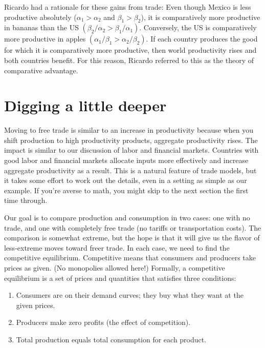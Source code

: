 Ricardo had a rationale for these gains from trade:  Even though
Mexico is less productive absolutely ($\alpha_{1}>\alpha_{2}$ and
$\beta_{1}>\beta_{2}$), it is comparatively more productive in
bananas than the US
$(\beta_{2}/\alpha_{2} > \beta_{1}/\alpha_{1})$.
Conversely, the US is comparatively more productive in apples
$ ( \alpha_{1}/\beta_{1} > \alpha_{2} /\beta_{2} )$.
If each country produces the good for which it is comparatively
more productive, then world productivity rises and both countries
benefit.
For this reason, Ricardo referred to this as the theory of comparative
advantage.


\section{Digging a little deeper}

Moving to free trade is similar to an
increase in productivity because when you shift production to high
productivity products, aggregate productivity rises.  The impact
is similar to our discussion of labor and financial markets.
Countries with good labor and financial markets allocate inputs
more effectively and increase aggregate productivity as a
result.  This is a natural feature of trade models, but it takes
some effort to work out the details, even in a setting as simple
as our example.  If you're averse to math, you might
skip to the next section the first time through.

Our goal is to compare production and consumption in two cases:
one with no trade, and one with completely free trade (no tariffs
or transportation costs).  The comparison is somewhat extreme, but
the hope is that it will give us the flavor of less-extreme moves
toward freer trade.  In each case, we need to find the competitive
equilibrium.  Competitive means that consumers and producers
take prices as given.  (No monopolies allowed here!)
Formally, a competitive equilibrium is a set of prices and
quantities that satisfies three conditions:
%
\begin{enumerate}
\item Consumers are on their demand curves;  they buy what they
want at the given prices.

\item Producers make zero profits (the effect of competition).

\item Total production equals total consumption for each product.
\end{enumerate}

